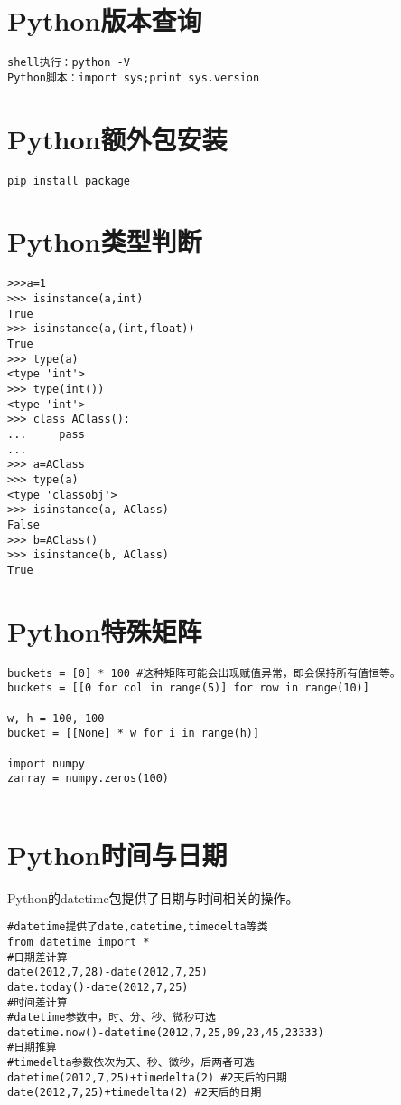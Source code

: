 

\section{Python版本查询}
\begin{verbatim}
shell执行：python -V
Python脚本：import sys;print sys.version
\end{verbatim}

\section{Python额外包安装}
\begin{verbatim}
pip install package
\end{verbatim}


\section{Python类型判断}
\begin{verbatim}
>>>a=1
>>> isinstance(a,int)
True
>>> isinstance(a,(int,float))
True
>>> type(a)
<type 'int'>
>>> type(int())
<type 'int'>
>>> class AClass():
...     pass
... 
>>> a=AClass
>>> type(a)
<type 'classobj'>
>>> isinstance(a, AClass)
False
>>> b=AClass()
>>> isinstance(b, AClass)
True
\end{verbatim}

\section{Python特殊矩阵}
\begin{verbatim}
buckets = [0] * 100 #这种矩阵可能会出现赋值异常，即会保持所有值恒等。
buckets = [[0 for col in range(5)] for row in range(10)]

w, h = 100, 100
bucket = [[None] * w for i in range(h)]

import numpy
zarray = numpy.zeros(100)


\end{verbatim}











\section{Python时间与日期} 

Python的datetime包提供了日期与时间相关的操作。
\begin{verbatim}
#datetime提供了date,datetime,timedelta等类
from datetime import * 
#日期差计算
date(2012,7,28)-date(2012,7,25)
date.today()-date(2012,7,25)
#时间差计算
#datetime参数中，时、分、秒、微秒可选
datetime.now()-datetime(2012,7,25,09,23,45,23333)
#日期推算
#timedelta参数依次为天、秒、微秒，后两者可选
datetime(2012,7,25)+timedelta(2) #2天后的日期
date(2012,7,25)+timedelta(2) #2天后的日期
\end{verbatim}

